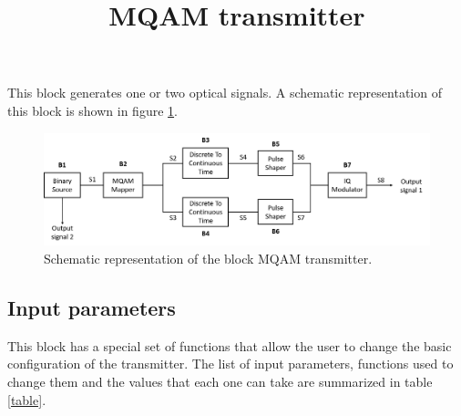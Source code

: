\documentclass[a4paper]{article}
\title{MQAM transmitter}
\begin{document}
\maketitle
This block generates one or two optical signals. A schematic representation of this block is shown in figure \ref{MQAM_transmitter_block_diagram}.

\begin{figure}
	\centering
	\includegraphics[width=\textwidth]{MQAM_transmitter_block_diagram}
	\caption{Schematic representation of the block MQAM transmitter.}\label{MQAM_transmitter_block_diagram}
\end{figure}

\subsection*{Input parameters}

This block has a special set of functions that allow the user to change the basic configuration of the transmitter. The list of input parameters, functions used to change them and the values that each one can take are summarized in table \ref{table}.
\end{document}
